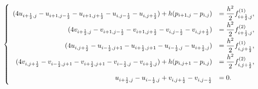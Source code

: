 \documentclass[final,leqno]{siamltex704}
\begin{document}
\setlength{\arraycolsep}{0.5pt}
\begin{equation}\label{equ.Stokes_FDS_comp}
\left\{
\renewcommand\arraystretch{2}
\begin{array}{rl}
 \displaystyle(4u_{i+\frac{1}{2},j}-u_{i+1,j-\frac{1}{2}} - u_{i+1,j+\frac{1}{2}} - u_{i,j-\frac{1}{2}}- u_{i,j+\frac{1}{2}}) + h(p_{i+1,j}-p_{i,j})&=\displaystyle\frac{h^2}{2}f^{(1)}_{i+\frac{1}{2},j},\\
\displaystyle(4v_{i+\frac{1}{2},j}-v_{i+1,j-\frac{1}{2}} - v_{i+1,j+\frac{1}{2}} -v_{i,j-\frac{1}{2}}-v_{i,j+\frac{1}{2}}) &=\displaystyle\frac{h^2}{2}f^{(2)}_{i+\frac{1}{2},j},\\
 \displaystyle(4u_{i,j+\frac{1}{2}}-u_{i-\frac{1}{2},j+1} - u_{i+\frac{1}{2},j+1} -u_{i-\frac{1}{2},j}-u_{i+\frac{1}{2},j})&=
 \displaystyle\frac{h^2}{2}f^{(1)}_{i,j+\frac{1}{2}},\\
 \displaystyle(4v_{i,j+\frac{1}{2}}-v_{i-\frac{1}{2},j+1} - v_{i+\frac{1}{2},j+1} - v_{i-\frac{1}{2},j}- v_{i+\frac{1}{2},j}) + h(p_{i,j+1}-p_{i,j})&=\displaystyle\frac{h^2}{2}f^{(2)}_{i,j+\frac{1}{2}},\\
 u_{i+\frac{1}{2},j} - u_{i-\frac{1}{2},j} + v_{i,j+\frac{1}{2}} - v_{i,j-\frac{1}{2}}&=0.\\
\end{array}
\right.
\end{equation}
\end{document}
